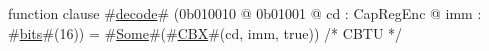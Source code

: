 function clause #\hyperref[sailMIPSzdecode]{decode}# (0b010010 @ 0b01001 @ cd : CapRegEnc @ imm : #\hyperref[sailMIPSzbits]{bits}#(16)) = #\hyperref[sailMIPSzSome]{Some}#(#\hyperref[sailMIPSzCBX]{CBX}#(cd, imm, true))  /* CBTU */
